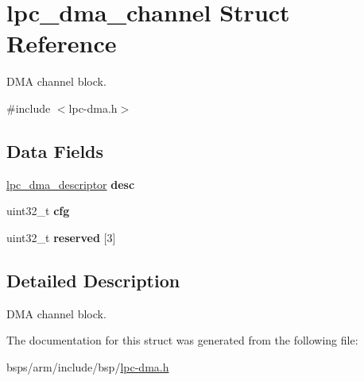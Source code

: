 \hypertarget{structlpc__dma__channel}{}\section{lpc\+\_\+dma\+\_\+channel Struct Reference}
\label{structlpc__dma__channel}


D\+MA channel block.  




{\ttfamily \#include $<$lpc-\/dma.\+h$>$}

\subsection*{Data Fields}
\begin{DoxyCompactItemize}
\item 
\mbox{\label{structlpc__dma__channel_a5040bc3781a1ade87c91a3627f5ee784}} 
\mbox{\hyperlink{structlpc__dma__descriptor}{lpc\+\_\+dma\+\_\+descriptor}} {\bfseries desc}
\item 
\mbox{\label{structlpc__dma__channel_aa2d0f82d4482bbc913bb441ac7555413}} 
uint32\+\_\+t {\bfseries cfg}
\item 
\mbox{\label{structlpc__dma__channel_a5d05cf854ef1dfc553cd38f30f120e18}} 
uint32\+\_\+t {\bfseries reserved} \mbox{[}3\mbox{]}
\end{DoxyCompactItemize}


\subsection{Detailed Description}
D\+MA channel block. 

The documentation for this struct was generated from the following file\+:\begin{DoxyCompactItemize}
\item 
bsps/arm/include/bsp/\mbox{\hyperlink{lpc-dma_8h}{lpc-\/dma.\+h}}\end{DoxyCompactItemize}

